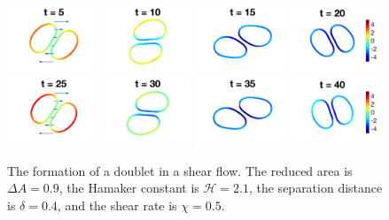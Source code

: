 \documentclass[prf,superscriptaddress,showkeys]{revtex4-1}
\begin{document}
\begin{figure}[htp]
  \includegraphics[width=0.24\textwidth]{figs/adR4em1adS2p1e0Chi5em1_ra090_image01.png}
  \includegraphics[width=0.24\textwidth]{figs/adR4em1adS2p1e0Chi5em1_ra090_image02.png}
  \includegraphics[width=0.24\textwidth]{figs/adR4em1adS2p1e0Chi5em1_ra090_image03.png}
  \includegraphics[width=0.24\textwidth]{figs/adR4em1adS2p1e0Chi5em1_ra090_image04.png}
  \includegraphics[width=0.24\textwidth]{figs/adR4em1adS2p1e0Chi5em1_ra090_image05.png}
  \includegraphics[width=0.24\textwidth]{figs/adR4em1adS2p1e0Chi5em1_ra090_image06.png}
  \includegraphics[width=0.24\textwidth]{figs/adR4em1adS2p1e0Chi5em1_ra090_image07.png}
  \includegraphics[width=0.24\textwidth]{figs/adR4em1adS2p1e0Chi5em1_ra090_image08.png}
  \caption{\label{fig:doublet090-strongAdhesion} The formation of a
  doublet in a shear flow.  The reduced area is $\Delta A = 0.9$, the
  Hamaker constant is $\mathcal{H}=2.1$, the separation distance is
  $\delta = 0.4$, and the shear rate is $\chi=0.5$.}
\end{figure}
\end{document}
